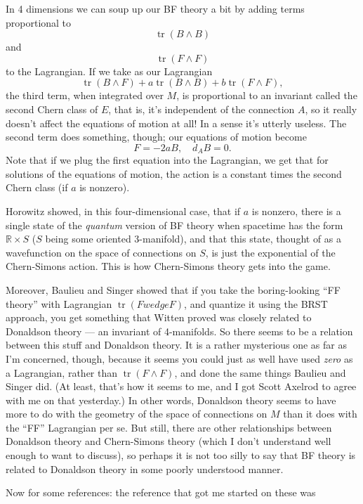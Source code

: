 \documentclass{article}
\begin{document}
In 4 dimensions we can soup up our BF theory a bit by adding terms
proportional to \[\operatorname{tr}(B \wedge B)\] and
\[\operatorname{tr}(F \wedge F)\] to the Lagrangian. If we take as our
Lagrangian
\[\operatorname{tr}(B \wedge F) + a \operatorname{tr}(B \wedge B) + b \operatorname{tr}(F \wedge F),\]
the third term, when integrated over \(M\), is proportional to an
invariant called the second Chern class of \(E\), that is, it's
independent of the connection \(A\), so it really doesn't affect the
equations of motion at all! In a sense it's utterly useless. The second
term does something, though; our equations of motion become
\[F = -2aB, \quad d_A B = 0.\] Note that if we plug the first equation
into the Lagrangian, we get that for solutions of the equations of
motion, the action is a constant times the second Chern class (if \(a\)
is nonzero).

Horowitz showed, in this four-dimensional case, that if \(a\) is
nonzero, there is a single state of the \emph{quantum} version of BF
theory when spacetime has the form \(\mathbb{R} \times S\) (\(S\) being
some oriented 3-manifold), and that this state, thought of as a
wavefunction on the space of connections on \(S\), is just the
exponential of the Chern-Simons action. This is how Chern-Simons theory
gets into the game.

Moreover, Baulieu and Singer showed that if you take the boring-looking
``FF theory'' with Lagrangian \(\operatorname{tr}(F wedge F)\), and
quantize it using the BRST approach, you get something that Witten
proved was closely related to Donaldson theory --- an invariant of
4-manifolds. So there seems to be a relation between this stuff and
Donaldson theory. It is a rather mysterious one as far as I'm concerned,
though, because it seems you could just as well have used \emph{zero} as
a Lagrangian, rather than \(\operatorname{tr}(F \wedge F)\), and done
the same things Baulieu and Singer did. (At least, that's how it seems
to me, and I got Scott Axelrod to agree with me on that yesterday.) In
other words, Donaldson theory seems to have more to do with the geometry
of the space of connections on \(M\) than it does with the ``FF''
Lagrangian per se. But still, there are other relationships between
Donaldson theory and Chern-Simons theory (which I don't understand well
enough to want to discuss), so perhaps it is not too silly to say that
BF theory is related to Donaldson theory in some poorly understood
manner.

Now for some references: the reference that got me started on these was
\end{document}
